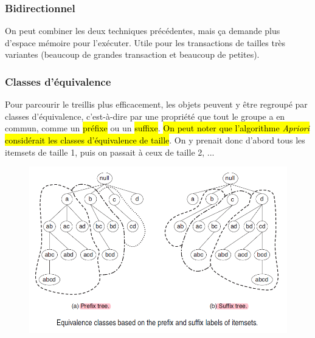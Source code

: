 \documentclass[letterpaper, 12pt]{article}
\newcommand{\alinea}{
\hspace*{0.5cm}}
\begin{document}
			\subsubsection{Bidirectionnel}
				\alinea On peut combiner les deux techniques précédentes,
					mais ça demande plus d'espace mémoire pour l'exécuter.
					Utile pour les transactions de tailles très variantes
					(beaucoup de grandes transaction et beaucoup de petites).
			\subsubsection{Classes d'équivalence}
				\alinea Pour parcourir le treillis plus efficacement,
					les objets peuvent y être regroupé par classes
					d'équivalence, c'est-à-dire par une propriété que
					tout le groupe a en commun, comme un \hl{préfixe} ou 
					un \hl{suffixe}. \hl{On peut noter que l'algorithme 
					\textit{Apriori} considérait les classes d'équivalence
					de taille}. On y prenait donc d'abord tous les itemsets
					de taille 1, puis on passait à ceux de taille 2, ...
				\begin{figure}[H]
					\centering
					\includegraphics[scale=0.65]{Images/lattice_2.png}
					\caption{}
					\label{fig:lattice:2}
				\end{figure}\noindent
\end{document}
